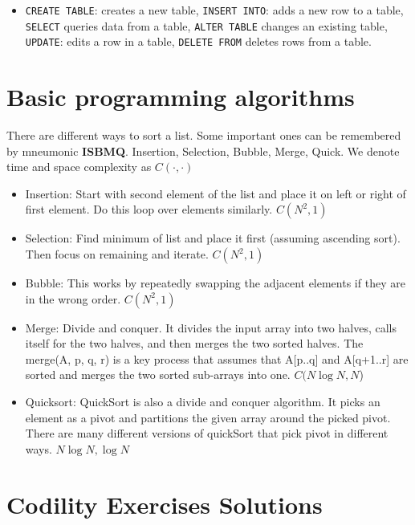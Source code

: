 \documentclass[11pt]{article}
\begin{document}
\begin{itemize}
\item \texttt{CREATE TABLE}: creates a new table,  \texttt{INSERT INTO}: adds a new row to a table, \texttt{SELECT} queries data from a table, 
\texttt{ALTER TABLE} changes an existing table, \texttt{UPDATE}: edits a row in a table, \texttt{DELETE FROM} deletes rows from a table. 
\end{itemize} 



\section{Basic programming algorithms}

There are different ways to sort a list. Some important ones can be remembered by mneumonic \textbf{ISBMQ}. 
Insertion, Selection, Bubble, Merge, Quick. We denote time and space complexity as $C(\cdot, \cdot)$

\begin{itemize} 
\item Insertion: Start with second element of the list and place it on left or right of first element. Do this loop over elements similarly.  $C(N^2, 1)$
\item Selection: Find minimum of list and place it first (assuming ascending sort). Then focus on remaining and iterate.   $C(N^2, 1)$
\item Bubble: This works by repeatedly swapping the adjacent elements if they are in the wrong order.  $C(N^2, 1)$
\item Merge: Divide and conquer. It divides the input array into two halves, calls itself for the two halves, and then merges the two sorted halves.  The merge(A, p, q, r) is a key process that assumes that A[p..q] and A[q+1..r] are sorted and merges the two sorted sub-arrays into one. $C(N \log N, N$)
\item Quicksort: QuickSort is also a divide and conquer algorithm. It picks an element as a pivot and partitions the given array around the picked pivot. There are many different versions of quickSort that pick pivot in different ways. $N \log N, \log N$
\end{itemize} 



\section{Codility Exercises Solutions}
\end{document}
